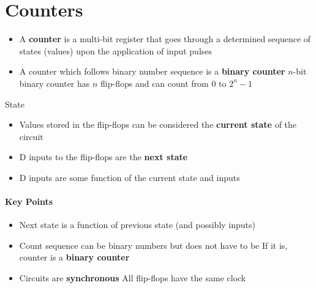 \section{Counters}
\begin{itemize}
	\item A \textbf{counter} is a multi-bit register that goes through a determined sequence of states (values) upon the application of input pulses
	\item A counter which follows binary number sequence is a \textbf{binary counter}
	\subitem $n$-bit binary counter has $n$ flip-flops and can count from 0 to $2^n-1$
\end{itemize}

\begin{note}{State}
	\begin{itemize}
		\item Values stored in the flip-flops can be considered the \textbf{current state} of the circuit
		\item D inputs to the flip-flops are the \textbf{next state}
		\item D inputs are some function of the current state and inputs	
	\end{itemize}
\end{note}


\paragraph{Key Points}
\begin{itemize}
	\item Next state is a function of previous state (and possibly inputs)
	\item Count sequence can be binary numbers but does not have to be
	\subitem If it is, counter is a \textbf{binary counter}
	\item Circuits are \textbf{synchronous}
	\subitem All flip-flops have the same clock	
\end{itemize}

